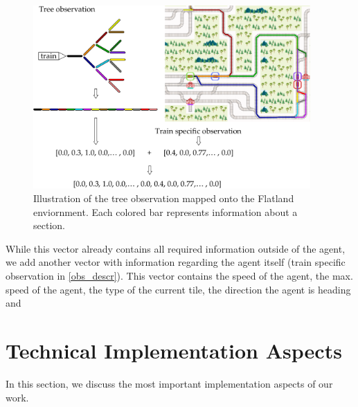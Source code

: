 \begin{figure}[H]
	\centering
	\includegraphics[width=300pt]{diagrams/tree_obs_mapping.pdf}
	\caption{Illustration of the tree observation mapped onto the Flatland enviornment. Each colored bar represents information about a section.}
	\label{obs_descr}
\end{figure}
While this vector already contains all required information outside of the agent, we add another vector with information regarding the agent itself (train specific observation in \autoref{obs_descr}). This vector contains the speed of the agent, the max. speed of the agent, the type of the current tile, the direction the agent is heading and 

\section{Technical Implementation Aspects}\label{software}
In this section, we discuss the most important implementation aspects of our work. 
